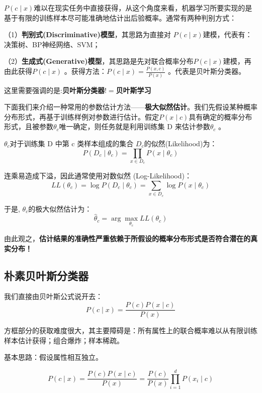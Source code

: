 $P(c\mid x)$难以在现实任务中直接获得，从这个角度来看，机器学习所要实现的是基于有限的训练样本尽可能准确地估计出后验概率。通常有两种判别方式：

（1）\textbf{判别式(Discriminative)模型}，其思路为直接对  $P(c\mid x)$建模，代表有：决策树、BP神经网络、SVM；

（2）\textbf{生成式(Generative)模型}，其思路是先对联合概率分布$P(c\mid x)$建模，再由此获得$P(c\mid x)$  。获得方法：$P(c\mid x)=\frac{P(x,c)}{P(x)}$  。代表是贝叶斯分类器。

这里需要强调的是:\textbf{贝叶斯分类器$!=$贝叶斯学习}

下面我们来介绍一种常用的参数估计方法——\textbf{极大似然估计}。我们先假设某种概率分布形式，再基于训练样例对参数进行估计。假定$P(x\mid c)$具有确定的概率分布形式，且被参数$\theta_{c}$唯一确定，则任务就是利用训练集 D 来估计参数$\theta_{c}$   。

$\theta_{c}$对于训练集 D 中第 c 类样本组成的集合 $D_{c}$的似然(Likelihood)为：
\begin{equation}P(D_c\mid\theta_c)=\prod_{x\in D_c}P(x\mid\theta_c)\end{equation}

连乘易造成下溢，因此通常使用对数似然 (Log-Likelihood)： 
\begin{equation}LL(\theta_c)=\log P(D_c\mid\theta_c)=\sum_{x\in D_c}\log P(x\mid\theta_c)\end{equation}

于是, $\theta_{c}$的极大似然估计为：
\begin{equation}\hat{\theta}_c=\arg\max_{\theta_c}LL(\theta_c)\end{equation}

由此观之，\textbf{估计结果的准确性严重依赖于所假设的概率分布形式是否符合潜在的真实分布！}

\subsection{朴素贝叶斯分类器}
我们直接由贝叶斯公式说开去： 
\begin{equation}P(c\mid x)=\frac{P(c)\boxed{P(x\mid c)}}{P(x)}\end{equation}

方框部分的获取难度很大，其主要障碍是：所有属性上的联合概率难以从有限训练样本估计获得；组合爆炸；样本稀疏。

基本思路：假设属性相互独立。

\begin{equation}P(c\mid x)=\frac{P(c)P(x\mid c)}{P(x)}=\frac{P(c)}{P(x)}\prod_{i=1}^dP(x_i\mid c)\end{equation}

